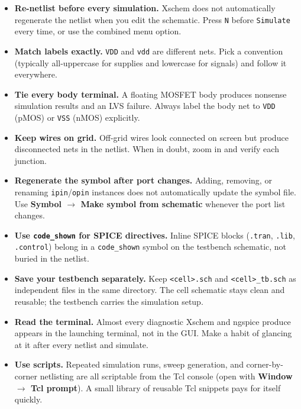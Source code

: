 \documentclass[11pt]{article}
\begin{document}
\begin{itemize}[leftmargin=2em]
  \item \textbf{Re-netlist before every simulation.}
        Xschem does not automatically regenerate the netlist when you
        edit the schematic.
        Press \texttt{N} before \texttt{Simulate} every time, or use
        the combined menu option.

  \item \textbf{Match labels exactly.}
        \texttt{VDD} and \texttt{vdd} are different nets.
        Pick a convention (typically all-uppercase for supplies and
        lowercase for signals) and follow it everywhere.

  \item \textbf{Tie every body terminal.}
        A floating MOSFET body produces nonsense simulation results
        and an LVS failure.
        Always label the body net to \texttt{VDD} (pMOS) or \texttt{VSS}
        (nMOS) explicitly.

  \item \textbf{Keep wires on grid.}
        Off-grid wires look connected on screen but produce
        disconnected nets in the netlist.
        When in doubt, zoom in and verify each junction.

  \item \textbf{Regenerate the symbol after port changes.}
        Adding, removing, or renaming \texttt{ipin}/\texttt{opin}
        instances does not automatically update the symbol file.
        Use \textbf{Symbol $\rightarrow$ Make symbol from schematic}
        whenever the port list changes.

  \item \textbf{Use \texttt{code\_shown} for SPICE directives.}
        Inline SPICE blocks (\texttt{.tran}, \texttt{.lib},
        \texttt{.control}) belong in a \texttt{code\_shown} symbol on
        the testbench schematic, not buried in the netlist.

  \item \textbf{Save your testbench separately.}
        Keep \texttt{<cell>.sch} and \texttt{<cell>\_tb.sch} as
        independent files in the same directory.
        The cell schematic stays clean and reusable; the testbench
        carries the simulation setup.

  \item \textbf{Read the terminal.}
        Almost every diagnostic Xschem and ngspice produce appears in
        the launching terminal, not in the GUI.
        Make a habit of glancing at it after every netlist and
        simulate.

  \item \textbf{Use scripts.}
        Repeated simulation runs, sweep generation, and corner-by-corner
        netlisting are all scriptable from the Tcl console (open with
        \textbf{Window $\rightarrow$ Tcl prompt}).
        A small library of reusable Tcl snippets pays for itself
        quickly.
\end{itemize}
\end{document}
